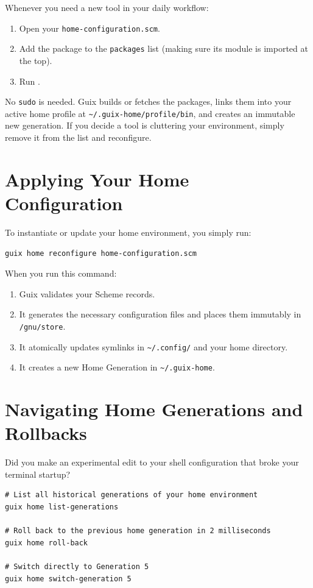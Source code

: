 Whenever you need a new tool in your daily workflow:
\begin{enumerate}
  \item Open your \texttt{home-configuration.scm}.
  \item Add the package to the \texttt{packages} list (making sure its module is imported at the top).
  \item Run .
\end{enumerate}

No \texttt{sudo} is needed. Guix builds or fetches the packages, links them into your active home profile at \texttt{\textasciitilde/.guix-home/profile/bin}, and creates an immutable new generation. If you decide a tool is cluttering your environment, simply remove it from the list and reconfigure.

\section{Applying Your Home Configuration}

To instantiate or update your home environment, you simply run:

\begin{lstlisting}[style=guixcli]
guix home reconfigure home-configuration.scm
\end{lstlisting}

When you run this command:
\begin{enumerate}
  \item Guix validates your Scheme records.
  \item It generates the necessary configuration files and places them immutably in \texttt{/gnu/store}.
  \item It atomically updates symlinks in \texttt{\textasciitilde/.config/} and your home directory.
  \item It creates a new Home Generation in \texttt{\textasciitilde/.guix-home}.
\end{enumerate}

\section{Navigating Home Generations and Rollbacks}

Did you make an experimental edit to your shell configuration that broke your terminal startup?

\begin{lstlisting}[style=guixcli]
# List all historical generations of your home environment
guix home list-generations

# Roll back to the previous home generation in 2 milliseconds
guix home roll-back

# Switch directly to Generation 5
guix home switch-generation 5
\end{lstlisting}

